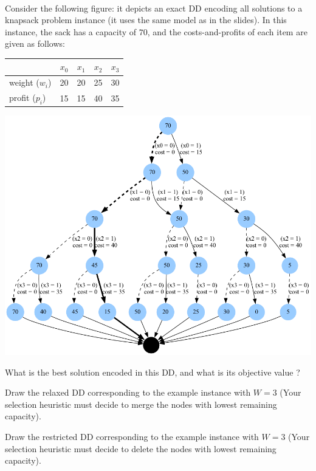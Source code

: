 \documentclass[12pt]{report}
\newcommand{\answerbox}[2]{\hfill\break\\
        \framebox[\linewidth]{\parbox[c][#1][c]{\dimexpr\linewidth-2\fboxsep-2\fboxrule}{#2}}
}
\begin{document}
\begin{Exercise}[title={Application to Knapsack}]\\
Consider the following figure: it depicts an exact DD encoding all solutions to a knapsack problem instance (it uses the same model as in the slides). In this instance, the sack has a capacity of $70$, and the costs-and-profits of each item are given as follows:
\begin{center}
\begin{tabular}{| l | r | r | r | r | }
	\hline
	                            &$x_0$ &$x_1$&$x_2$ &$x_3$ \\
	\hline
	weight ($w_i$) &       20 &     20 &      25  &       30 \\
	profit    ($p_i$) &      15  &      15 &       40 &       35 \\
	\hline
\end{tabular}

\vspace*{1.5cm}
\includegraphics*[width=.9\textwidth]{kp_exact.png}
\end{center}

\vspace*{1.5cm}
\Question What is the best solution encoded in this DD, and what is its objective value ?
\answerbox{3cm}{
}

\newpage
\Question Draw the relaxed DD corresponding to the example instance with $W = 3$ (Your selection heuristic must decide to merge the nodes with lowest remaining capacity). 
\answerbox{20cm}{
}

\newpage
\Question Draw the restricted DD corresponding to the example instance with $W = 3$  (Your selection heuristic must decide to delete the nodes with lowest remaining capacity). 
\answerbox{20cm}{
}
\end{Exercise}
\end{document}
